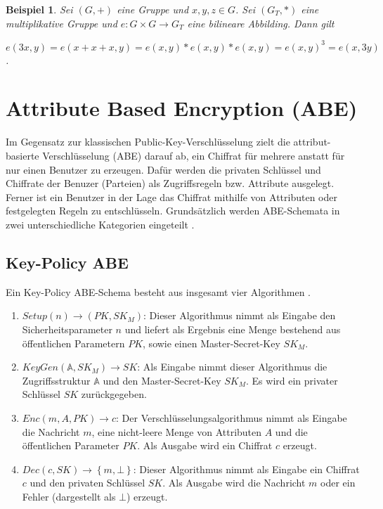 \documentclass{hsflensburg}
\newtheorem*{example}{Beispiel}
\begin{document}
	\begin{example}
		Sei $(G, +)$ eine Gruppe und $x, y, z \in G$. Sei $(G_T, *)$ eine multiplikative
		Gruppe und $e: G \times G \to G_T$ eine bilineare Abbilding. Dann gilt

		$e(3x, y) = e(x+x+x, y) = e(x, y) * e(x, y) * e(x, y) = e(x, y)^3 = e(x,
		3y)$.
	\end{example}

	\section{Attribute Based Encryption (ABE)}
	Im Gegensatz zur klassischen Public-Key-Verschlüsselung zielt die
	attribut-basierte Verschlüsselung (ABE) darauf ab, ein Chiffrat für mehrere anstatt
	für nur einen Benutzer zu erzeugen. Dafür werden die privaten Schlüssel und
	Chiffrate der Benuzer (Parteien) als Zugriffsregeln bzw. Attribute ausgelegt.
	Ferner ist ein Benutzer in der Lage das Chiffrat mithilfe von Attributen oder
	festgelegten Regeln zu entschlüsseln. Grundsätzlich werden ABE-Schemata in
	zwei unterschiedliche Kategorien eingeteilt \cite{phoabe}.

	\subsection{Key-Policy ABE}
	Ein Key-Policy ABE-Schema besteht aus insgesamt vier Algorithmen \cite{kp-abe}.

	\begin{enumerate}
		\item $\textit{Setup}\left(n\right) \to \left(PK, SK_M\right)$: Dieser
			Algorithmus nimmt als Eingabe den Sicherheitsparameter $n$ und liefert als
			Ergebnis eine Menge bestehend aus öffentlichen Parametern $PK$, sowie
			einen Master-Secret-Key $SK_M$.
		\item $\textit{KeyGen}\left(\mathbb{A}, SK_M\right) \to SK$: Als Eingabe
			nimmt dieser Algorithmus die Zu\-griffs\-struktur $\mathbb{A}$ und den
			Master-Secret-Key $SK_M$. Es wird ein privater Schlüssel $SK$
			zurückgegeben.
		\item $Enc\left(m, A, PK\right) \to c$: Der Verschlüsselungsalgorithmus
			nimmt als Eingabe die Nachricht $m$, eine nicht-leere Menge von Attributen
			$A$ und die öffentlichen Parameter $PK$. Als Ausgabe wird ein Chiffrat $c$
			erzeugt.
		\item $Dec\left(c, SK\right) \to \left\{m, \bot\right\}$: Dieser Algorithmus
			nimmt als Eingabe ein Chiffrat $c$ und den privaten Schlüssel $SK$. Als
			Ausgabe wird die Nachricht $m$ oder ein Fehler (dargestellt als $\bot$)
			erzeugt.
	\end{enumerate}
\end{document}
